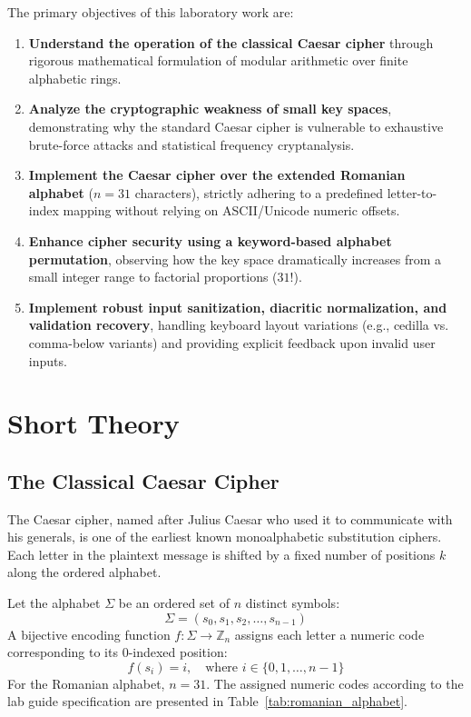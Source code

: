 \documentclass[12pt,a4paper]{article}
\begin{document}
The primary objectives of this laboratory work are:
\begin{enumerate}
    \item \textbf{Understand the operation of the classical Caesar cipher} through rigorous mathematical formulation of modular arithmetic over finite alphabetic rings.
    \item \textbf{Analyze the cryptographic weakness of small key spaces}, demonstrating why the standard Caesar cipher is vulnerable to exhaustive brute-force attacks and statistical frequency cryptanalysis.
    \item \textbf{Implement the Caesar cipher over the extended Romanian alphabet} ($n = 31$ characters), strictly adhering to a predefined letter-to-index mapping without relying on ASCII/Unicode numeric offsets.
    \item \textbf{Enhance cipher security using a keyword-based alphabet permutation}, observing how the key space dramatically increases from a small integer range to factorial proportions ($31!$).
    \item \textbf{Implement robust input sanitization, diacritic normalization, and validation recovery}, handling keyboard layout variations (e.g., cedilla vs. comma-below variants) and providing explicit feedback upon invalid user inputs.
\end{enumerate}

\section{Short Theory}

\subsection{The Classical Caesar Cipher}
The Caesar cipher, named after Julius Caesar who used it to communicate with his generals, is one of the earliest known monoalphabetic substitution ciphers. Each letter in the plaintext message is shifted by a fixed number of positions $k$ along the ordered alphabet.

Let the alphabet $\Sigma$ be an ordered set of $n$ distinct symbols:
\begin{equation}
    \Sigma = (s_0, s_1, s_2, \dots, s_{n-1})
\end{equation}
A bijective encoding function $f: \Sigma \to \mathbb{Z}_n$ assigns each letter a numeric code corresponding to its 0-indexed position:
\begin{equation}
    f(s_i) = i, \quad \text{where } i \in \{0, 1, \dots, n-1\}
\end{equation}
For the Romanian alphabet, $n = 31$. The assigned numeric codes according to the lab guide specification are presented in Table~\ref{tab:romanian_alphabet}.
\end{document}

